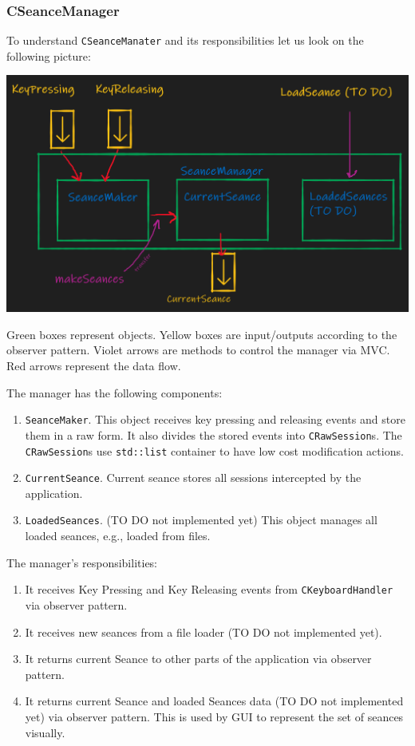 \documentclass{article}
\begin{document}
\subsubsection{CSeanceManager}

To understand \verb"CSeanceManater" and its responsibilities let us look on the following picture:
\begin{center}
\includegraphics[scale = 0.4]{Figures/SeanceManager.png}

Green boxes represent objects. Yellow boxes are input/outputs according to the observer pattern. Violet arrows are methods to control the manager via MVC. Red arrows represent the data flow.
\end{center}

The manager has the following components:
\begin{enumerate}
\item \verb"SeanceMaker". This object receives key pressing and releasing events and store them in a raw form. It also divides the stored events into \verb"CRawSession"s. The \verb"CRawSession"s use \verb"std::list" container to have low cost modification actions.

\item \verb"CurrentSeance". Current seance stores all sessions intercepted by the application.

\item \verb"LoadedSeances". (TO DO not implemented yet) This object manages all loaded seances, e.g., loaded from files.
\end{enumerate}

The manager's responsibilities:
\begin{enumerate}
\item It receives Key Pressing and Key Releasing events from \verb"CKeyboardHandler" via observer pattern.

\item It receives new seances from a file loader (TO DO not implemented yet).

\item It returns current Seance to other parts of the application via observer pattern.

\item It returns current Seance and loaded Seances data (TO DO not implemented yet) via observer pattern. This is used by GUI to represent the set of seances visually.
\end{enumerate}
\end{document}
